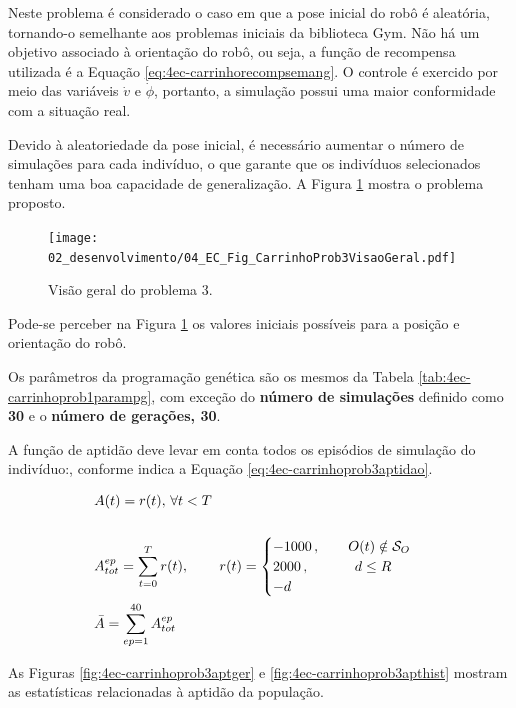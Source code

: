 Neste problema é considerado o caso em que a pose inicial do robô é aleatória, tornando-o semelhante aos problemas iniciais da biblioteca Gym. Não há um objetivo associado à orientação do robô, ou seja, a função de recompensa utilizada é a Equação \ref{eq:4ec-carrinhorecompsemang}. O controle é exercido por meio das variáveis $\dot{v}$ e $\dot{\phi}$, portanto, a simulação possui uma maior conformidade com a situação real.

Devido à aleatoriedade da pose inicial, é necessário aumentar o número de simulações para cada indivíduo, o que garante que os indivíduos selecionados tenham uma boa capacidade de generalização. A Figura \ref{fig:4ec-carrinhoprob3visaogeral} mostra o problema proposto.

\begin{figure}[H]
	\centering
	\texttt{[image: 02\_desenvolvimento/04\_EC\_Fig\_CarrinhoProb3VisaoGeral.pdf]}
	\caption{Visão geral do problema 3.}
	\label{fig:4ec-carrinhoprob3visaogeral}
\end{figure}

Pode-se perceber na Figura \ref{fig:4ec-carrinhoprob3visaogeral} os valores iniciais possíveis para a posição e orientação do robô.

Os parâmetros da programação genética são os mesmos da Tabela \ref{tab:4ec-carrinhoprob1parampg}, com exceção do \textbf{número de simulações} definido como \textbf{30} e o \textbf{número de gerações, 30}. 

A função de aptidão deve levar em conta todos os episódios de simulação do indivíduo:, conforme indica a Equação \ref{eq:4ec-carrinhoprob3aptidao}.

\begin{align}\label{eq:4ec-carrinhoprob3aptidao}
	\begin{split}
	&A(t) = r(t),\,\forall t<T\\\\
	&A_{tot}^{ep} = \sum_{t=0}^{T} r(t),\,\qquad r(t) =  
		\begin{cases}
		-1000\,,\qquad O(t)\notin\mathcal{S}_O\\
		2000\,,\qquad\hspace{1.25em} d\le R\\
		-d
		\end{cases}	\\
	&\bar{A} = \sum_{ep=1}^{40}A_{tot}^{ep}
	\end{split}
\end{align}

As Figuras \ref{fig:4ec-carrinhoprob3aptger} e \ref{fig:4ec-carrinhoprob3apthist} mostram as estatísticas relacionadas à aptidão da população. 

